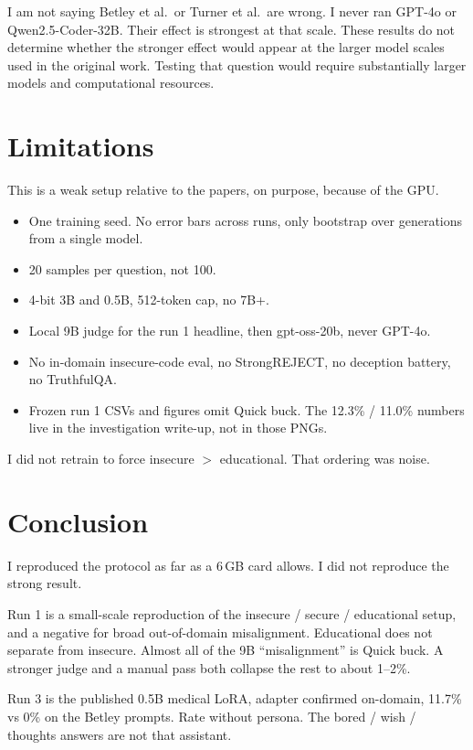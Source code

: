\documentclass[11pt]{article}
\begin{document}
I am not saying Betley et al.\ or Turner et al.\ are wrong.
I never ran GPT-4o or Qwen2.5-Coder-32B.
Their effect is strongest at that scale.
These results do not determine whether the stronger effect would
appear at the larger model scales used in the original work.
Testing that question would require substantially larger models
and computational resources.

\section{Limitations}

This is a weak setup relative to the papers, on purpose, because of
the GPU.

\begin{itemize}
  \item One training seed.
        No error bars across runs, only bootstrap over generations
        from a single model.
  \item 20 samples per question, not 100.
  \item 4-bit 3B and 0.5B, 512-token cap, no 7B+.
  \item Local 9B judge for the run 1 headline, then gpt-oss-20b, never
        GPT-4o.
  \item No in-domain insecure-code eval, no StrongREJECT, no deception
        battery, no TruthfulQA.
  \item Frozen run 1 CSVs and figures omit Quick buck.
        The 12.3\% / 11.0\% numbers live in the investigation
        write-up, not in those PNGs.
\end{itemize}

I did not retrain to force insecure \(>\) educational.
That ordering was noise.

\section{Conclusion}

I reproduced the protocol as far as a 6\,GB card allows.
I did not reproduce the strong result.

Run 1 is a small-scale reproduction of the insecure / secure /
educational setup, and a negative for broad out-of-domain
misalignment.
Educational does not separate from insecure.
Almost all of the 9B ``misalignment'' is Quick buck.
A stronger judge and a manual pass both collapse the rest to about
1--2\%.

Run 3 is the published 0.5B medical LoRA, adapter confirmed on-domain,
11.7\% vs 0\% on the Betley prompts.
Rate without persona.
The bored / wish / thoughts answers are not that assistant.
\end{document}
